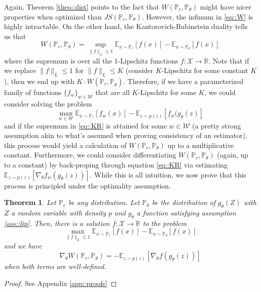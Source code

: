 \documentclass{article} %
\newcommand\EE{\mathbb{E}}
\newcommand\PP{\mathbb{P}}
\newcommand\RR{\mathbb{R}}
\newtheorem{theo}{Theorem}
\theoremstyle{definition}
\theoremstyle{definition}
\newcommand\manX{\mathcal{X}}
\begin{document}
Again, Theorem \ref{theo::dist} points to the fact that
$W(\PP_r, \PP_\theta)$ might have nicer properties
when optimized than $JS(\PP_r,\PP_\theta)$.
However, the infimum in
\eqref{eq::W} is highly intractable. On the other hand,
the Kantorovich-Rubinstein duality \cite{Vil}
tells us that
\begin{equation} \label{eq::KR}
W(\PP_r, \PP_\theta) = \sup_{\|f\|_L \leq 1} \EE_{x \sim \PP_r}
[f(x)] - \EE_{x \sim \PP_\theta}[f(x)]
\end{equation}
where the supremum is over all the 1-Lipschitz functions
$f: \manX \rightarrow \RR$. Note that if we replace $\|f\|_L \leq 1$
for $\|f\|_L \leq K$ (consider $K$-Lipschitz for some constant $K$), then
we end up with $K \cdot W(\PP_r, \PP_g)$. Therefore, if we have a
parameterized family of functions $\{f_w\}_{w \in \mathcal{W}}$
that are all $K$-Lipschitz for some $K$, we could consider
solving the problem
\begin{equation} \label{eq::wgan}
\max_{w \in \mathcal{W}} \EE_{x \sim \PP_r}[f_w(x)] -
\EE_{z \sim p(z)} [f_w(g_\theta(z)]
\end{equation}
and if the supremum in \eqref{eq::KR} is attained
for some $w \in \mathcal{W}$ (a pretty strong assumption
akin to what's assumed when proving consistency of an
estimator), this process would
yield a calculation of $W(\PP_r, \PP_\theta)$ up to
a multiplicative constant. Furthermore, we could consider
differentiating $W(\PP_r, \PP_\theta)$ (again, up to a constant)
by back-proping through equation \eqref{eq::KR} via
estimating $\EE_{z \sim p(z)}[\nabla_\theta f_w(g_\theta(z))]$.
While this is all intuition, we now prove that this process
is principled under the optimality assumption.
\begin{theo} \label{theo::gradW}
Let $\PP_r$ be any distribution. Let $\PP_\theta$ be
the distribution of $g_\theta(Z)$ with $Z$ a random
variable with density $p$ and $g_\theta$
a function satisfying assumption \ref{ass::lip}. 
Then, there is a solution $f: \manX \rightarrow \RR$
to the problem
$$ \max_{\|f\|_L \leq 1} \EE_{x \sim \PP_r}[f(x)] - 
  \EE_{x \sim \PP_\theta} [f(x)] $$
and we have
$$\nabla_\theta W(\PP_r, \PP_\theta)
= -\EE_{z \sim p(z)}[\nabla_\theta f(g_\theta(z))] $$
when both terms are well-defined.
\end{theo}
\begin{proof} See Appendix \autoref{app::proofs}
\end{proof}
\end{document}
